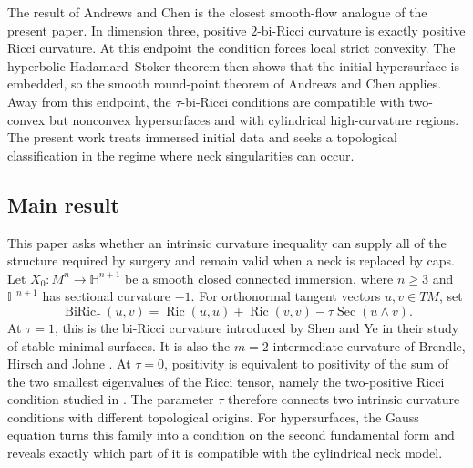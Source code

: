 \documentclass[11pt,reqno]{amsart}
\theoremstyle{definition}
\theoremstyle{remark}
\numberwithin{equation}{section}
\newcommand{\Hh}{\mathbb H}
\newcommand{\Ric}{\operatorname{Ric}}
\begin{document}
The result of Andrews and Chen \cite{AC17} is the closest smooth-flow analogue
of the present paper.  In dimension three, positive $2$-bi-Ricci curvature is
exactly positive Ricci curvature.  At this endpoint the condition forces local
strict convexity.  The hyperbolic Hadamard--Stoker theorem \cite{Alexander77}  then shows that the initial hypersurface is embedded, so the smooth round-point theorem
of Andrews and Chen applies.  Away from this endpoint, the $\tau$-bi-Ricci
conditions are compatible with two-convex but nonconvex hypersurfaces and with
cylindrical high-curvature regions.  The present work treats immersed initial
data and seeks a topological classification in the regime where neck
singularities can occur.


\subsection{Main result}

This paper asks whether an intrinsic curvature inequality can supply all of
the structure required by surgery and remain valid when a neck is replaced by
caps.  Let $X_0:M^n\to\Hh^{n+1}$ be a smooth closed connected immersion,
where $n\geq3$ and $\Hh^{n+1}$ has sectional curvature $-1$.  For orthonormal tangent
vectors $u,v\in TM$, set
\begin{equation}\label{eq:intro-taubiric}
 \operatorname{BiRic}_{\tau}(u,v)
 =\Ric(u,u)+\Ric(v,v)-\tau\operatorname{Sec}(u\wedge v).
\end{equation}
At $\tau=1$, this is the bi-Ricci curvature introduced by Shen and Ye
\cite{SY96} in their study of stable minimal surfaces.  It is also the $m=2$
intermediate curvature of Brendle, Hirsch and Johne \cite{BHJ24}.  At
$\tau=0$, positivity is equivalent to positivity of the sum of the two
smallest eigenvalues of the Ricci tensor, namely the two-positive Ricci
condition studied in \cite{CW22,CM26,Wolf}.  The parameter $\tau$
therefore connects two intrinsic curvature conditions with different
topological origins.  For hypersurfaces, the Gauss equation turns this family
into a condition on the second fundamental form and reveals exactly
which part of it is compatible with the cylindrical neck model.
\end{document}
